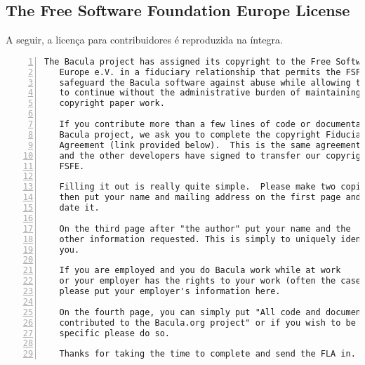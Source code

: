 \subsection{The Free Software Foundation Europe License}
A seguir, a licença para contribuidores é reproduzida na íntegra.
\begin{Verbatim}[frame=single, fontsize=\tiny, numbers=left, label=\url{http://www.bacula.org/en/?page=fsfe}]
   The Bacula project has assigned its copyright to the Free Software Foundation
   Europe e.V. in a fiduciary relationship that permits the FSFE to
   safeguard the Bacula software against abuse while allowing the project
   to continue without the administrative burden of maintaining the
   copyright paper work.

   If you contribute more than a few lines of code or documentation to the
   Bacula project, we ask you to complete the copyright Fiduciary License
   Agreement (link provided below).  This is the same agreement that I (Kern)
   and the other developers have signed to transfer our copyrights to the
   FSFE.

   Filling it out is really quite simple.  Please make two copies,
   then put your name and mailing address on the first page and
   date it.

   On the third page after "the author" put your name and the
   other information requested. This is simply to uniquely identify
   you.  
   
   If you are employed and you do Bacula work while at work
   or your employer has the rights to your work (often the case),
   please put your employer's information here.
   
   On the fourth page, you can simply put "All code and documentation
   contributed to the Bacula.org project" or if you wish to be more
   specific please do so.

   Thanks for taking the time to complete and send the FLA in.
\end{Verbatim}



